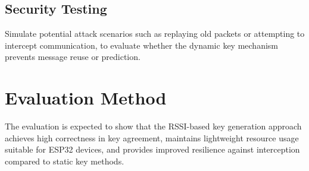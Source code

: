 \subsection{ Security Testing}
Simulate potential attack scenarios such as replaying old packets or attempting to intercept communication, to evaluate whether the dynamic key mechanism prevents message reuse or prediction.

 \section{Evaluation Method}
 The evaluation is expected to show that the RSSI-based key generation approach achieves high correctness in key agreement, maintains lightweight resource usage suitable for ESP32 devices, and provides improved resilience against interception compared to static key methods.
